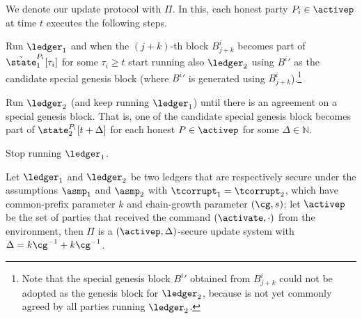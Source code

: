  


We denote our update protocol with $\Pi$. In this, each honest party $P_i\in\activep$ at time $t$ executes the following steps.

\begin{myenumerate}
	\item Run $\ledger_1$ and when the $(j+k)$-th block $B^i_{j+k}$ becomes part of $\check \state_1^{P_i}[\tau_i]$ for some $\tau_i \geq t$
	start running also $\ledger_2$ using ${B^i}'$ as the candidate special genesis block (where ${B^i}'$ is generated using $B^i_{j+k}$).\footnote{Note that
	the special genesis block ${B^i}'$ obtained from $B^i_{j+k}$ could not be adopted as the genesis block for $\ledger_2$, because is not yet commonly agreed by all parties running $\ledger_2$.}
	\item Run $\ledger_2$ (and keep running $\ledger_1$) until there is an agreement on a special genesis block. That is, one of the candidate special genesis block 
	becomes part of $\state_2^{P_i}[t+\Delta]$ for each honest $P\in\activep$ for some $\Delta\in\mathbb{N}$.
	\item Stop running $\ledger_1$.
\end{myenumerate}



\begin{theorem}\label{th:main}
Let $\ledger_1$ and $\ledger_2$ be two ledgers that are respectively secure under the assumptions $\asmp_1$ and $\asmp_2$ with $\tcorrupt_1=\tcorrupt_2$, which have common-prefix parameter $k$ and chain-growth parameter $(\cg, s)$; let $\activep$ be the set of parties that received the command $(\activate,\cdot)$ from the environment, then
 $\Pi$ is a $(\activep,\Delta)$-secure update system with $\Delta=k \cg^{-1} + k \cg^{-1}$.
\end{theorem}


